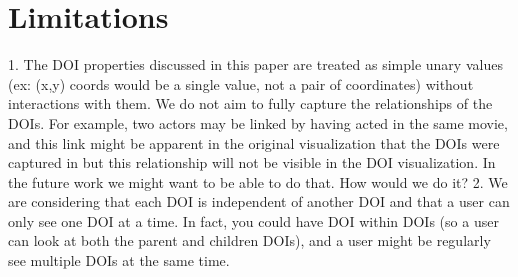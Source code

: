 \section{Limitations}
1.	The DOI properties discussed in this paper are treated as simple unary values (ex: (x,y) coords would be a single value, not a pair of coordinates) without interactions with them. We do not aim to fully capture the relationships of the DOIs. For example, two actors may be linked by having acted in the same movie, and this link might be apparent in the original visualization that the DOIs were captured in but this relationship will not be visible in the DOI visualization. In the future work we might want to be able to do that. How would we do it?
2.	We are considering that each DOI is independent of another DOI and that a user can only see one DOI at a time. In fact, you could have DOI within DOIs (so a user can look at both the parent and children DOIs), and a user might be regularly see multiple DOIs at the same time. 


